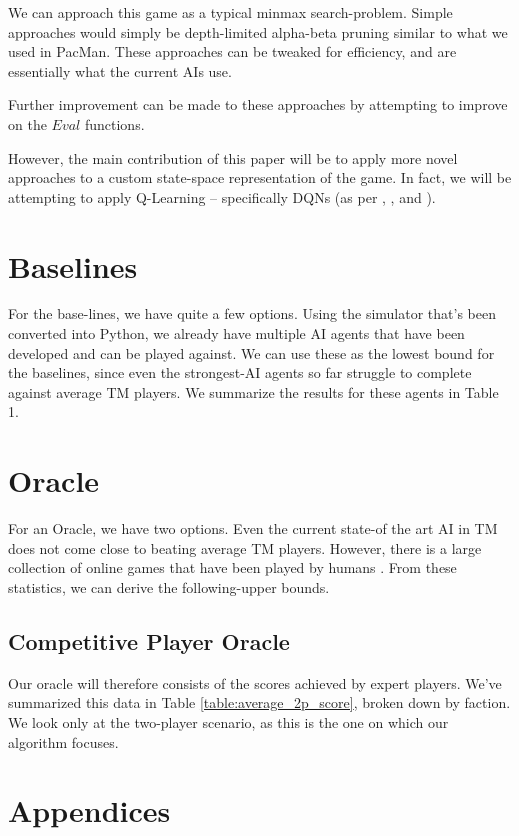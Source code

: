 \documentclass[12pt,twocolumn,letterpaper]{article}
\begin{document}
We can approach this game as a typical minmax search-problem. Simple approaches would simply be depth-limited alpha-beta pruning similar to what we used in PacMan. These approaches can be tweaked for efficiency, and are essentially what the current AIs use.

Further improvement can be made to these approaches by attempting to improve on the $Eval$ functions.

However, the main contribution of this paper will be to apply more novel approaches to a custom state-space representation of the game. In fact, we will be attempting to apply Q-Learning -- specifically DQNs (as per \cite{AlphaGo}, \cite{AlphaGoZero}, and \cite{AlphaZero}). 

\section{Baselines}
For the base-lines, we have quite a few options. Using the simulator that's been converted into Python, we already have multiple AI agents that have been developed and can be played against. We can use these as the lowest bound for the baselines, since even the strongest-AI agents so far struggle to complete against average TM players. We summarize the results for these agents in Table 1.

\section{Oracle}
For an Oracle, we have two options. Even the current state-of the art AI in TM does not come close to beating average TM players. However, there is a large collection of online games that have been played by humans \cite{TMStats}. From these statistics, we can derive the following-upper bounds.

\subsection{Competitive Player Oracle}
Our oracle will therefore consists of the scores achieved by expert players. We've summarized this data in Table \ref{table:average_2p_score}, broken down by faction. We look only at the two-player scenario, as this is the one on which our algorithm focuses.

\section{Appendices}
\end{document}
